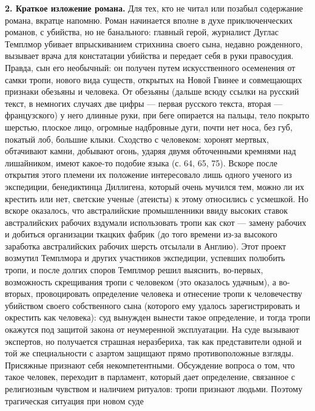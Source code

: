 \textbf{2.  Краткое  изложение романа.}  Для  тех,  кто не  читал  или
позабыл содержание романа, вкратце  напомню. Роман начинается вполне в
духе приключенческих  романов, с  убийства, но не  банального: главный
герой,  журналист  Дуглас  Темплмор  убивает  впрыскиванием  стрихнина
своего  сына,  недавно  рожденного,  вызывает  врача  для  констатации
убийства и передает себя в руки правосудия. Правда, сын его необычный:
он получен путем искусственного осеменения от самки тропи, нового вида
существ,  открытых на  Новой  Гвинее и  совмещающих признаки  обезьяны
и  человека.  От  обезьяны  (дальше всюду  ссылки  на  русский  текст,
в  немногих  случаях две  цифры  ---  первая русского  текста,  вторая
---  французского)  у  него  длинные   руки,  при  беге  опирается  на
пальцы, тело покрыто шерстью,  плоское лицо, огромные надбровные дуги,
почти  нет носа,  без  губ,  покатый лоб,  большие  клыки. Сходство  с
человеком: хоронят  мертвых, обтачивают камни, добывают  огонь, ударяя
двумя  обточенными кремнями  над  лишайником,  имеют какое-то  подобие
языка  (с.  64,  65,  75).  Вскоре после  открытия  этого  племени  их
положение интересовало лишь одного ученого из экспедиции, бенедиктинца
Диллигена,  который  очень  мучился  тем, можно  ли  их  крестить  или
нет,  светские ученые  (атеисты)  к этому  относились  с усмешкой.  Но
вскоре оказалось, что австралийские промышленники ввиду высоких ставок
австралийских рабочих вздумали использовать  тропи как скот --- замену
рабочих и добиться  организации ткацких фабрик (до  того времени из-за
высокого заработка  австралийских рабочих  шерсть отсылали  в Англию).
Этот  проект  возмутил  Темплмора   и  других  участников  экспедиции,
успевших  полюбить  тропи,  и   после  долгих  споров  Темплмор  решил
выяснить, во-первых,  возможность скрещивания  тропи с  человеком (это
оказалось удачным), а во-вторых,  провоцировать определение человека и
отнесение  тропи к  человечеству  убийством  своего собственного  сына
(которого ему удалось зарегистрировать  и окрестить как человека): суд
вынужден вынести такое определение, и тогда тропи окажутся под защитой
закона  от  неумеренной  эксплуатации.  На  суде  вызывают  экспертов,
но  получается  страшная  неразбериха,  так  как  представители  одной
и  той  же  специальности  с азартом  защищают  прямо  противоположные
взгляды. Присяжные  признают себя некомпетентными.  Обсуждение вопроса
о  том,  что  такое  человек,  переходит  в  парламент,  который  дает
определение,  связанное с  религиозным чувством  и наличием  ритуалов:
тропи  признают людьми.  Поэтому трагическая  ситуация при  новом суде
